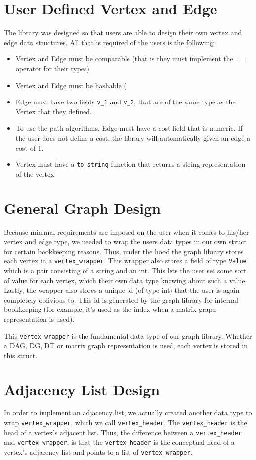 \documentclass{article}
\begin{document}
\section{User Defined Vertex and Edge}
The library was designed so that users are able to design their own vertex and edge data structures. All that is required of the users is the following:
\begin{itemize}
\item Vertex and Edge must be comparable (that is they must implement the == operator for their types)
\item Vertex and Edge must be hashable (
\item Edge must have two fields \texttt{v\_1} and \texttt{v\_2}, that are of the same type as the Vertex that they defined.
\item To use the path algorithms, Edge must have a cost field that is numeric. If the user does not define a cost, the library will automatically given an edge a cost of 1.
\item Vertex must have a \texttt{to\_string} function that returns a string representation of the vertex. 
\end{itemize}

\section{General Graph Design}
Because minimal requirements are imposed on the user when it comes to his/her vertex and edge type, we needed to wrap the users data types in our own struct for certain bookkeeping reasons. Thus, under the hood the graph library stores each vertex in a \texttt{vertex\_wrapper}. This wrapper also stores a field of type \texttt{Value} which is a pair consisting of a string and an int. This lets the user set some sort of value for each vertex, which their own data type knowing about such a value. Lastly, the wrapper also stores a unique id (of type int) that the user is again completely oblivious to. This id is generated by the graph library for internal bookkeeping (for example, it's used as the index when a matrix graph representation is used). 
\par
This \texttt{vertex\_wrapper} is the fundamental data type of our graph library. Whether a DAG, DG, DT or matrix graph representation is used, each vertex is stored in this struct. 

\section{Adjacency List Design}
In order to implement an adjacency list, we actually created another data type to wrap \texttt{vertex\_wrapper}, which we call \texttt{vertex\_header}. The \texttt{vertex\_header} is the head of a vertex's adjacent list. Thus, the difference between a \texttt{vertex\_header} and \texttt{vertex\_wrapper}, is that the \texttt{vertex\_header} is the conceptual head of a vertex's adjacency list and points to a list of  \texttt{vertex\_wrapper}.
\newpage
\end{document}
